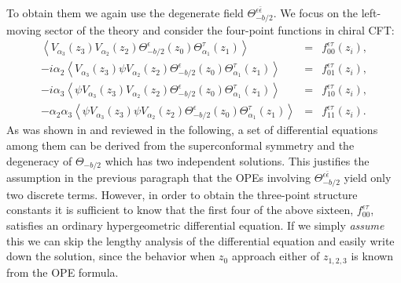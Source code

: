 \documentclass[a4paper,12pt]{article}
\newcommand{\vev}[1]{\left<{#1}\right>}
\newcommand{\ep}{{\epsilon}}
\newcommand{\bep}{{\bar{\epsilon}}}
\begin{document}
   To obtain them we again use the degenerate field
 $\Theta^{\ep\bep}_{-b/2}$.
 We focus on the left-moving sector of the theory and consider
 the four-point functions in chiral CFT:
\begin{equation}
\begin{array}{rcl}
  \vev{V_{\alpha_3}(z_3)V_{\alpha_2}(z_2)
       \Theta_{-b/2}^{\ep}(z_0)\Theta_{\alpha_1}^{\tau}(z_1)}
 &=& f_{00}^{\ep\tau}(z_i), \\
  -i\alpha_2\vev{V_{\alpha_3}(z_3)\psi V_{\alpha_2}(z_2)
       \Theta_{-b/2}^{\ep}(z_0)\Theta_{\alpha_1}^{\tau}(z_1)}
 &=& f_{01}^{\ep\tau}(z_i), \\
  -i\alpha_3\vev{\psi V_{\alpha_3}(z_3)V_{\alpha_2}(z_2)
       \Theta_{-b/2}^{\ep}(z_0)\Theta_{\alpha_1}^{\tau}(z_1)}
 &=& f_{10}^{\ep\tau}(z_i), \\
  -\alpha_2\alpha_3\vev{\psi V_{\alpha_3}(z_3)\psi V_{\alpha_2}(z_2)
       \Theta_{-b/2}^{\ep}(z_0)\Theta_{\alpha_1}^{\tau}(z_1)}
 &=& f_{11}^{\ep\tau}(z_i).
\end{array}
\end{equation}
 As was shown in \cite{Poghosian} and reviewed in the following,
 a set of differential equations among them can be derived from
 the superconformal symmetry and the degeneracy of $\Theta_{-b/2}$
 which has two independent solutions.
 This justifies the assumption in the previous paragraph that the OPEs
 involving $\Theta_{-b/2}^{\ep\bep}$ yield only two discrete terms.
 However, in order to obtain the three-point structure constants
 it is sufficient to know that the first four of the above sixteen,
 $f_{00}^{\ep\tau}$, satisfies an ordinary hypergeometric
 differential equation.
 If we simply {\it assume} this we can skip the lengthy
 analysis of the differential equation and easily write down
 the solution, since the behavior when $z_0$ approach either
 of $z_{1,2,3}$ is known from the OPE formula.

\end{document}
